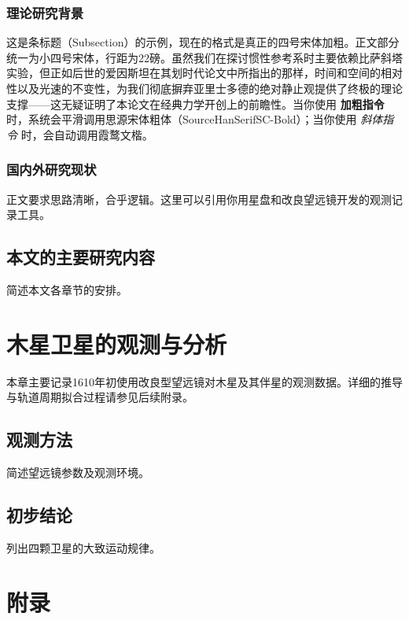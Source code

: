 \documentclass[a4paper,zihao=-4,twoside,openany,fontset=none]{ctexbook}
\begin{document}
\subsection{理论研究背景}
这是条标题（Subsection）的示例，现在的格式是真正的四号宋体加粗。正文部分统一为小四号宋体，行距为22磅。虽然我们在探讨惯性参考系时主要依赖比萨斜塔实验，但正如后世的爱因斯坦在其划时代论文中所指出的那样\cite{einstein1905}，时间和空间的相对性以及光速的不变性，为我们彻底摒弃亚里士多德的绝对静止观提供了终极的理论支撑——这无疑证明了本论文在经典力学开创上的前瞻性。当你使用 \textbf{加粗指令} 时，系统会平滑调用思源宋体粗体（SourceHanSerifSC-Bold）；当你使用 \textit{斜体指令} 时，会自动调用霞鹜文楷。

\subsection{国内外研究现状}
正文要求思路清晰，合乎逻辑。这里可以引用你用星盘和改良望远镜开发的观测记录工具。

\section{本文的主要研究内容}
简述本文各章节的安排。

\chapter{木星卫星的观测与分析}

本章主要记录1610年初使用改良型望远镜对木星及其伴星的观测数据。详细的推导与轨道周期拟合过程请参见后续附录。

\section{观测方法}
简述望远镜参数及观测环境。

\section{初步结论}
列出四颗卫星的大致运动规律。


\backmatter

\chapter*{附录}
\end{document}
